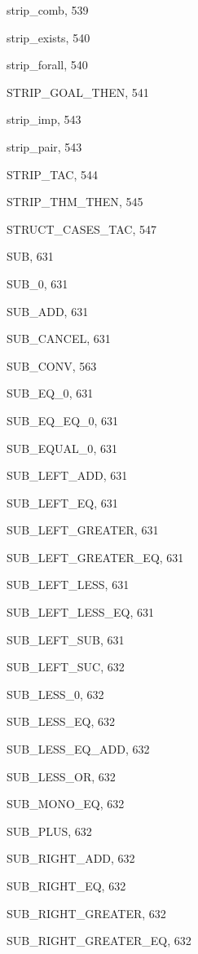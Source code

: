 \begin{theindex}
  \item {\ptt strip\_comb}, 539
  \item {\ptt strip\_exists}, 540
  \item {\ptt strip\_forall}, 540
  \item {\ptt STRIP\_GOAL\_THEN}, 541
  \item {\ptt strip\_imp}, 543
  \item {\ptt strip\_pair}, 543
  \item {\ptt STRIP\_TAC}, 544
  \item {\ptt STRIP\_THM\_THEN}, 545
  \item {\ptt STRUCT\_CASES\_TAC}, 547
  \item {\ptt SUB}, 631
  \item {\ptt SUB\_0}, 631
  \item {\ptt SUB\_ADD}, 631
  \item {\ptt SUB\_CANCEL}, 631
  \item {\ptt SUB\_CONV}, 563
  \item {\ptt SUB\_EQ\_0}, 631
  \item {\ptt SUB\_EQ\_EQ\_0}, 631
  \item {\ptt SUB\_EQUAL\_0}, 631
  \item {\ptt SUB\_LEFT\_ADD}, 631
  \item {\ptt SUB\_LEFT\_EQ}, 631
  \item {\ptt SUB\_LEFT\_GREATER}, 631
  \item {\ptt SUB\_LEFT\_GREATER\_EQ}, 631
  \item {\ptt SUB\_LEFT\_LESS}, 631
  \item {\ptt SUB\_LEFT\_LESS\_EQ}, 631
  \item {\ptt SUB\_LEFT\_SUB}, 631
  \item {\ptt SUB\_LEFT\_SUC}, 632
  \item {\ptt SUB\_LESS\_0}, 632
  \item {\ptt SUB\_LESS\_EQ}, 632
  \item {\ptt SUB\_LESS\_EQ\_ADD}, 632
  \item {\ptt SUB\_LESS\_OR}, 632
  \item {\ptt SUB\_MONO\_EQ}, 632
  \item {\ptt SUB\_PLUS}, 632
  \item {\ptt SUB\_RIGHT\_ADD}, 632
  \item {\ptt SUB\_RIGHT\_EQ}, 632
  \item {\ptt SUB\_RIGHT\_GREATER}, 632
  \item {\ptt SUB\_RIGHT\_GREATER\_EQ}, 632

\end{theindex}
